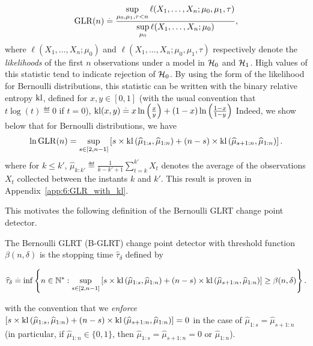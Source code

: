 \begin{equation}\label{eq:6:firstDefGLRT}
    \mathrm{GLR}(n) \overset{.}{=} \frac{\sup\limits_{\mu_0,\mu_1,\tau < n}\ell(X_1, \dots, X_n ; \mu_0,\mu_1,\tau)}{\sup\limits_{\mu_0}\ell(X_1, \dots, X_n ; \mu_0)},
\end{equation}
%
where $\ell(X_1, \dots, X_n ; \mu_0)$ and $\ell(X_1, \dots, X_n ; \mu_0,\mu_1,\tau)$ respectively denote the \emph{likelihoods} of the first $n$ observations under a model in $\mathcal{H}_0$ and $\mathcal{H}_1$.
High values of this statistic tend to indicate rejection of $\mathcal{H}_0$.
%
By using the form of the likelihood for Bernoulli distributions, this statistic can be written with the binary relative entropy $\mathrm{kl}$, defined for $x,y\in[0,1]$ (with the usual convention that $t \log(t) \eqdef 0$ if $t=0$),
$\mathrm{kl}(x,y) \overset{.}{=} x \ln\left(\frac{x}{y}\right) + (1-x)\ln\left(\frac{1-x}{1-y}\right)$
%
Indeed, we show below
that for Bernoulli distributions, we have
\begin{equation}\label{eq:6:secondDefGLRT}
    \ln \mathrm{GLR}(n) = \sup_{s \in [2,n-1]} \left[s \times \mathrm{kl}\left(\widehat{\mu}_{1:s},\widehat{\mu}_{1:n}\right) + (n-s) \times \mathrm{kl}\left(\widehat{\mu}_{s+1:n},\widehat{\mu}_{1:n}\right)\right].
\end{equation}
%
where for $k \leq k'$, $\widehat{\mu}_{k:k'} \eqdef \frac{1}{k - k' + 1} \sum\limits_{t=k}^{k'} X_t$ denotes the average of the observations $X_t$ collected between the instants $k$ and $k'$.
This result is proven in Appendix~\ref{app:6:GLR_with_kl}.
%

This motivates the following definition of the Bernoulli GLRT change point detector.

\begin{definition}\label{def:6:GLRDef}
\begin{leftbar}[defnbar]  %
    The Bernoulli GLRT (B-GLRT) change point detector with threshold function $\beta(n,\delta)$ is the stopping time $\widehat{\tau}_{\delta}$ defined by
    \begin{small}
        \begin{equation}\label{def:6:GLR}
            \widehat{\tau}_{\delta} \overset{.}{=} \inf \left\{ n \in \mathbb{N}^* : \sup_{s \in [2,n-1]} \left[s \times \mathrm{kl}\left(\widehat{\mu}_{1:s},\widehat{\mu}_{1:n}\right) + (n-s) \times \mathrm{kl}\left(\widehat{\mu}_{s+1:n},\widehat{\mu}_{1:n}\right)\right] \geq \beta(n,\delta)\right\}.
        \end{equation}
    \end{small}
    with the convention that we \emph{enforce} $\left[s \times \mathrm{kl}\left(\widehat{\mu}_{1:s},\widehat{\mu}_{1:n}\right) + (n-s) \times \mathrm{kl}\left(\widehat{\mu}_{s+1:n},\widehat{\mu}_{1:n}\right)\right] = 0$
    in the case of $\widehat{\mu}_{1:s} = \widehat{\mu}_{s+1:n}$
    (in particular, if $\widehat{\mu}_{1:n} \in \{0,1\}$, then $\widehat{\mu}_{1:s} = \widehat{\mu}_{s+1:n} = 0$ or $\widehat{\mu}_{1:n}$).
\end{leftbar}  %
\end{definition}

